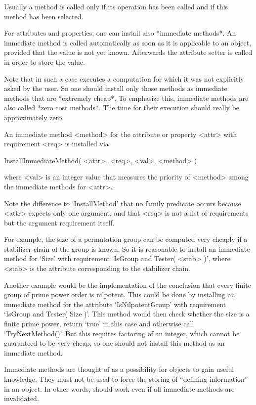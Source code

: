 Usually a method is called only if its operation has been called
and if this method has been selected.

For attributes and properties, one can install also *immediate methods*.
An immediate method is called automatically as soon as it is applicable
to an object, provided that the value is not yet known.
Afterwards the attribute setter is called in order to store the value.

Note that in such a case {\GAP} executes a computation for which
it was not explicitly asked by the user.
So one should install only those methods as immediate methods
that are *extremely cheap*.
To emphasize this, immediate methods are also called *zero cost methods*.
The time for their execution should really be approximately zero.

An immediate method <method> for the attribute or property <attr>
with requirement <req> is installed via

\>InstallImmediateMethod( <attr>, <req>, <val>, <method> )

where <val> is an integer value that measures the priority of <method>
among the immediate methods for <attr>.

Note the difference to `InstallMethod' that no family predicate occurs
because <attr> expects only one argument,
and that <req> is not a list of requirements but the argument requirement
itself.

For example, the size of a permutation group can be computed very cheaply
if a stabilizer chain of the group is known.
So it is reasonable to install an immediate method for `Size' with
requirement `IsGroup and Tester( <stab> )',
where <stab> is the attribute corresponding to the stabilizer chain.

Another example would be the implementation of the conclusion that
every finite group of prime power order is nilpotent.
This could be done by installing an immediate method for the attribute
`IsNilpotentGroup' with requirement `IsGroup and Tester( Size )'.
This method would then check whether the size is a finite prime power,
return `true' in this case and otherwise call `TryNextMethod()'.
But this requires factoring of an integer,
which cannot be guaranteed to be very cheap,
so one should not install this method as an immediate method.

Immediate methods are thought of as a possibility for objects to gain
useful knowledge.
They must not be used to force the storing of ``defining information''
in an object.
In other words, {\GAP} should work even if all immediate methods are
invalidated.

